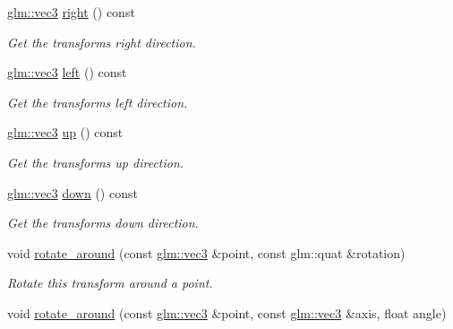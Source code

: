 \begin{DoxyCompactItemize}
\mbox{\hyperlink{namespacemoka_aed2224bc0e5b79e57a8975ded94ee1aaa97ade28e93c0de60adc075bdbe07ca36}{glm\+::vec3}} \mbox{\hyperlink{classmoka_1_1transform_a540766efeb8efe854972ec5f8fb41731}{right}} () const
\begin{DoxyCompactList}\small\item\em Get the transform\textquotesingle{}s right direction. \end{DoxyCompactList}\item 
\mbox{\hyperlink{namespacemoka_aed2224bc0e5b79e57a8975ded94ee1aaa97ade28e93c0de60adc075bdbe07ca36}{glm\+::vec3}} \mbox{\hyperlink{classmoka_1_1transform_ac5dbabdc02770433d351204cfbb199be}{left}} () const
\begin{DoxyCompactList}\small\item\em Get the transform\textquotesingle{}s left direction. \end{DoxyCompactList}\item 
\mbox{\hyperlink{namespacemoka_aed2224bc0e5b79e57a8975ded94ee1aaa97ade28e93c0de60adc075bdbe07ca36}{glm\+::vec3}} \mbox{\hyperlink{classmoka_1_1transform_a0f118e1b139568b3ca6722472c6ccfbd}{up}} () const
\begin{DoxyCompactList}\small\item\em Get the transform\textquotesingle{}s up direction. \end{DoxyCompactList}\item 
\mbox{\hyperlink{namespacemoka_aed2224bc0e5b79e57a8975ded94ee1aaa97ade28e93c0de60adc075bdbe07ca36}{glm\+::vec3}} \mbox{\hyperlink{classmoka_1_1transform_aa639b098139d6b5283ae39c992d70ccf}{down}} () const
\begin{DoxyCompactList}\small\item\em Get the transform\textquotesingle{}s down direction. \end{DoxyCompactList}\item 
void \mbox{\hyperlink{classmoka_1_1transform_af21853480a4f772450364f8f39687054}{rotate\+\_\+around}} (const \mbox{\hyperlink{namespacemoka_aed2224bc0e5b79e57a8975ded94ee1aaa97ade28e93c0de60adc075bdbe07ca36}{glm\+::vec3}} \&point, const glm\+::quat \&rotation)
\begin{DoxyCompactList}\small\item\em Rotate this transform around a point. \end{DoxyCompactList}\item 
void \mbox{\hyperlink{classmoka_1_1transform_a1ff4249932d7b23580834c1ea0bd8717}{rotate\+\_\+around}} (const \mbox{\hyperlink{namespacemoka_aed2224bc0e5b79e57a8975ded94ee1aaa97ade28e93c0de60adc075bdbe07ca36}{glm\+::vec3}} \&point, const \mbox{\hyperlink{namespacemoka_aed2224bc0e5b79e57a8975ded94ee1aaa97ade28e93c0de60adc075bdbe07ca36}{glm\+::vec3}} \&axis, float angle)

\end{DoxyCompactItemize}
